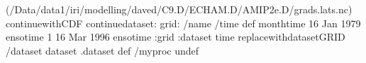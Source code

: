 \begin{ingrid}
(/Data/data1/iri/modelling/daved/C9.D/ECHAM.D/AMIP2e.D/grads.lats.nc) continuewithCDF
continuedataset: 
grid:
/name /time def
monthtime
16 Jan 1979 ensotime
1
16 Mar 1996 ensotime
:grid
:dataset
time replacewithdatasetGRID
/dataset dataset .dataset def
/myproc undef
\end{ingrid}
